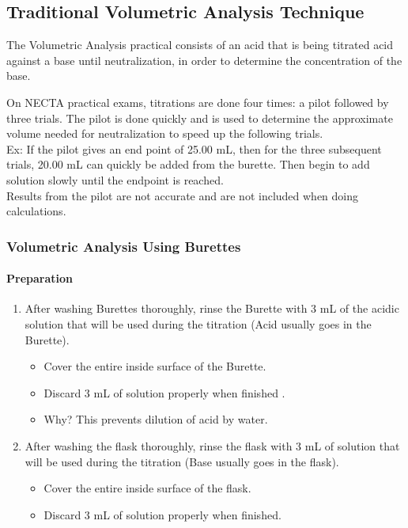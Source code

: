 \subsection{Traditional Volumetric Analysis Technique}
\label{cha:volanatech}

The Volumetric Analysis practical consists of an acid that is being titrated acid against a base until neutralization, in order to determine the concentration of the base.

On NECTA practical exams, titrations are done four times: a pilot followed by three trials. The pilot is done quickly and is used to determine the approximate volume needed for neutralization to speed up the following trials.\\

Ex: If the pilot gives an end point of 25.00 mL, then for the three subsequent trials, 20.00 mL can quickly be added from the burette. Then begin to add solution slowly until the endpoint is reached.\\

Results from the pilot are not accurate and are not included when doing calculations.  


\subsubsection{Volumetric Analysis Using Burettes}

\paragraph{Preparation}

\begin{enumerate}
\item After washing Burettes thoroughly, rinse the Burette with 3 mL of the acidic solution that will
be used during the titration (Acid usually goes in the Burette).
	\begin{itemize}
	\item Cover the entire inside surface of the Burette.
	\item Discard 3 mL of solution properly when finished  .
	\item Why? This prevents dilution of acid by water.
	\end{itemize}
\item After washing the flask thoroughly, rinse the flask with 3 mL of solution that will
be used during the titration (Base usually goes in the flask).
	\begin{itemize}
	\item Cover the entire inside surface of the flask.
	\item Discard 3 mL of solution properly when finished.
	\end{itemize}	
\end{enumerate}

